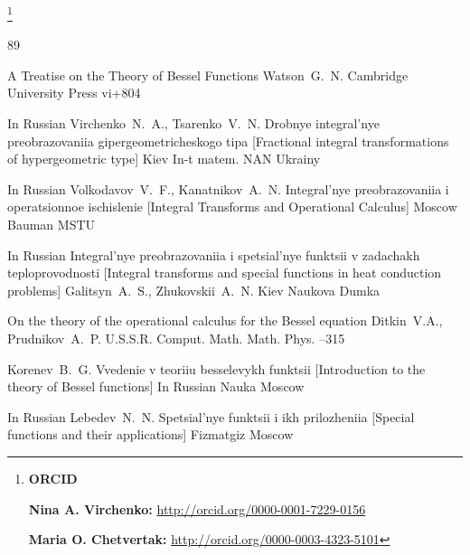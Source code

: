 \thanks{{\bf ORCID}

{\bf Nina A.  Virchenko:} \url{http://orcid.org/0000-0001-7229-0156}

{\bf Maria O. Chetvertak:} \url{http://orcid.org/0000-0003-4323-5101}


}


\EngRef

\begin{thebibliography}{89}

\book A Treatise on the Theory of Bessel Functions
\by Watson~G.~N.
\publaddr Cambridge
\publ University Press
\totalpages vi+804


\lang In Russian
\by Virchenko~N.~A., Tsarenko~V.~N. 
\book Drobnye integral'nye preobrazovaniia gipergeometri\-ches\-kogo tipa \rm [Fractional integral transformations of hypergeometric type]
\publaddr Kiev
\publ In-t matem. NAN Ukrainy


\lang In Russian
\by Volkodavov~V.~F., Kanatnikov~A.~N. 
\book Integral'nye preobrazovaniia i operatsionnoe ischislenie \rm [Integral Transforms and Operational Calculus]
\publaddr Moscow
\publ Bauman MSTU

\lang In Russian
\book Integral'nye preobrazovaniia i spetsial'nye funktsii v zadachakh teploprovodnosti \rm [Integral transforms and special functions in heat conduction problems]
\by Galitsyn~A.~S., Zhukovskii~A.~N.
\publaddr Kiev
\publ Naukova Dumka

\paper On the theory of the operational calculus for the Bessel equation
\by Ditkin~V.A., Prudnikov~A.~P.
\jour U.S.S.R. Comput. Math. Math. Phys.
--315

\by Korenev~B.~G.
\book Vvedenie v teoriiu besselevykh funktsii \rm [Introduction to the theory of Bessel functions]
\lang In Russian
\publ Nauka
\publaddr Moscow


\lang In Russian
\by  Lebedev~N.~N. 
\book Spetsial'nye funktsii i ikh prilozheniia \rm [Special functions and their applications] 
\publ Fizmatgiz
\publaddr Moscow 



\end{thebibliography}
